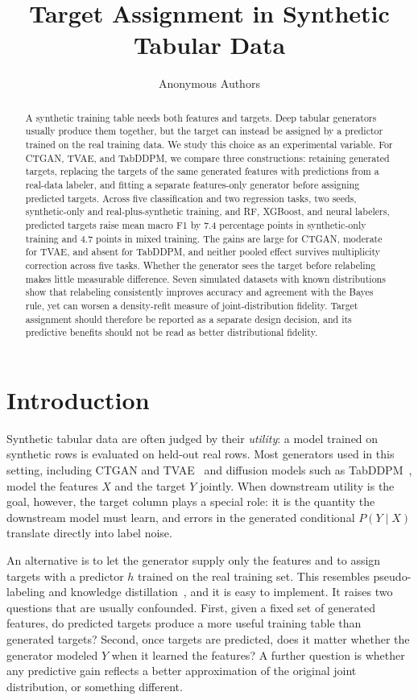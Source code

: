 \documentclass[letterpaper]{article}
\title{Target Assignment in Synthetic Tabular Data}
\author{Anonymous Authors}
\begin{document}
\maketitle
\begin{abstract}
A synthetic training table needs both features and targets. Deep tabular
generators usually produce them together, but the target can instead be
assigned by a predictor trained on the real training data. We study this
choice as an experimental variable. For CTGAN, TVAE, and TabDDPM, we compare
three constructions: retaining generated targets, replacing the targets of
the same generated features with predictions from a real-data labeler, and
fitting a separate features-only generator before assigning predicted
targets. Across five classification and two regression tasks, two seeds,
synthetic-only and real-plus-synthetic training, and RF, XGBoost, and neural
labelers, predicted targets raise mean macro F1 by 7.4 percentage points in
synthetic-only training and 4.7 points in mixed training. The gains are
large for CTGAN, moderate for TVAE, and absent for TabDDPM, and neither
pooled effect survives multiplicity correction across five tasks. Whether
the generator sees the target before relabeling makes little measurable
difference. Seven simulated datasets with known distributions show
that relabeling consistently improves accuracy and agreement with the Bayes
rule, yet can worsen a density-refit measure of joint-distribution
fidelity. Target assignment should therefore be reported as a separate
design decision, and its predictive benefits should not be read as better
distributional fidelity.
\end{abstract}

\section{Introduction}
Synthetic tabular data are often judged by their \emph{utility}: a model
trained on synthetic rows is evaluated on held-out real rows. Most
generators used in this setting, including CTGAN and
TVAE~\citep{xu2019ctgan} and diffusion models such as
TabDDPM~\citep{kotelnikov2023tabddpm}, model the features $X$ and the target
$Y$ jointly. When downstream utility is the goal, however, the target column
plays a special role: it is the quantity the downstream model must learn,
and errors in the generated conditional $P(Y\mid X)$ translate directly into
label noise.

An alternative is to let the generator supply only the features and to
assign targets with a predictor $h$ trained on the real training set. This
resembles pseudo-labeling and knowledge distillation~\citep{hinton2015distilling},
and it is easy to implement. It raises two questions that are usually
confounded. First, given a fixed set of generated features, do predicted
targets produce a more useful training table than generated targets?
Second, once targets are predicted, does it matter whether the generator
modeled $Y$ when it learned the features? A further question is whether any
predictive gain reflects a better approximation of the original joint
distribution, or something different.
\end{document}
